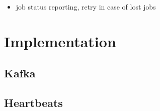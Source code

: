 \begin{itemize}
	\item job status reporting, retry in case of lost jobs
\end{itemize}

\section{Implementation}

\subsection{Kafka}

\subsection{Heartbeats}
